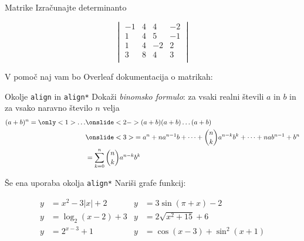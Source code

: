 \begin{frame}{Matrike}
	Izračunajte determinanto

		
		\[\begin{vmatrix}
			-1 & 4 & 4 & -2 \\
			1 & 4 & 5 & -1 \\
			1 & 4 & -2 & 2 \\
			3 & 8 & 4 & 3 \\
		\end{vmatrix}\]

	V pomoč naj vam bo Overleaf dokumentacija o matrikah:
	
	\href{https://www.overleaf.com/learn/latex/Matrices}{}
\end{frame}

\begin{frame}{Okolje \texttt{align} in \texttt{align*}}
	Dokaži \emph{binomsko formulo}: za vsaki realni števili $a$ in $b$ in za vsako naravno število $n$ velja
	\begin{align*}
	(a+b)^n = \only<1>\ldots 
	&\onslide<2->{(a+b) (a+b) \dots (a+b)} \\
	&\onslide<3>{= a^n + n a^{n-1} b + \dots + \binom{n}{k} a^{n-k} b^k + \dots + n a b^{n-1} + b^n} \\
	&= \sum_{k=0}^n \binom{n}{k} a^{n-k} b^k\\
	\end{align*}
	
\end{frame}

\begin{frame}{Še ena uporaba okolja \texttt{align*}}
	Nariši grafe funkcij:
	
	
	\begin{align*}
		y &= x^2 - 3|x| + 2     &y &= 3 \sin(\pi+x) - 2 \\
		y &= \log_2(x-2) + 3    &y &= 2 \sqrt{x^2+15} + 6 \\
		y &= 2^{x-3} + 1        &y &= \cos(x-3) + \sin^2(x+1) \\
	\end{align*}
	
\end{frame}


